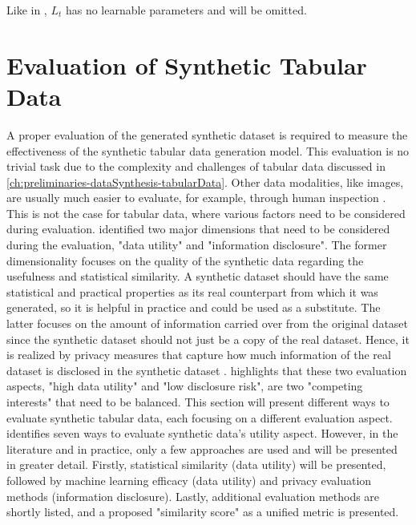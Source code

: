 Like in \cite{ho2020DenoisingDiffusionProbabilistic}, $L_{t}$ has no learnable parameters and will be omitted.

\section{Evaluation of Synthetic Tabular Data}
\label{ch:preliminaries-evaluationOfSyntheticTabularData}

A proper evaluation of the generated synthetic dataset is required to measure the effectiveness of the synthetic tabular data generation model.
This evaluation is no trivial task due to the complexity and challenges of tabular data discussed in \autoref{ch:preliminaries-dataSynthesis-tabularData}.
Other data modalities, like images, are usually much easier to evaluate, for example, through human inspection \cite{chundawat2022UniversalMetricRobust}. 
This is not the case for tabular data, where various factors need to be considered during evaluation.
\textcite[p. 6]{goncalves2020GenerationEvaluationSynthetic} identified two major dimensions that need to be considered during the evaluation, "data utility" and "information disclosure".
The former dimensionality focuses on the quality of the synthetic data regarding the usefulness and statistical similarity.
A synthetic dataset should have the same statistical and practical properties as its real counterpart from which it was generated, so it is helpful in practice and could be used as a substitute.
The latter focuses on the amount of information carried over from the original dataset since the synthetic dataset should not just be a copy of the real dataset.
Hence, it is realized by privacy measures that capture how much information of the real dataset is disclosed in the synthetic dataset \cite{goncalves2020GenerationEvaluationSynthetic}.
\textcite[p. 2]{little2021GenerativeAdversarialNetworksa} highlights that these two evaluation aspects, "high data utility" and "low disclosure risk", are two "competing interests" that need to be balanced.
This section will present different ways to evaluate synthetic tabular data, each focusing on a different evaluation aspect.
\cite{elemam2020SevenWaysEvaluate} identifies seven ways to evaluate synthetic data's utility aspect.
However, in the literature and in practice, only a few approaches are used and will be presented in greater detail.
Firstly, statistical similarity (data utility) will be presented, followed by machine learning efficacy (data utility) and privacy evaluation methods (information disclosure).
Lastly, additional evaluation methods are shortly listed, and a proposed "similarity score" as a unified metric is presented.

